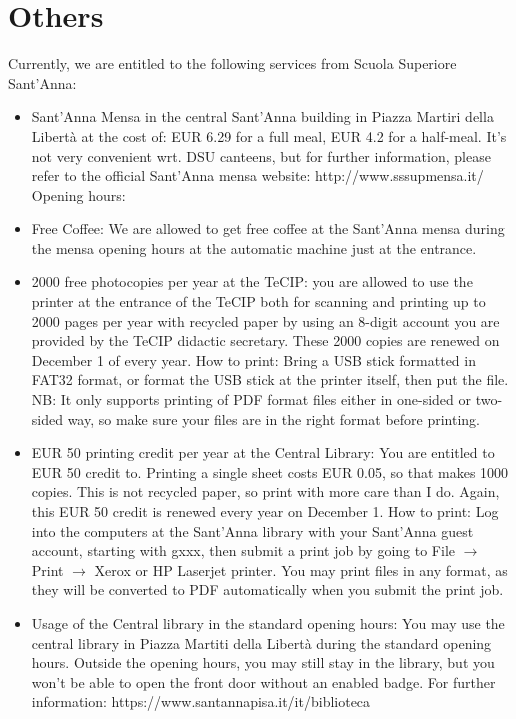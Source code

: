 \documentclass[11pt,fleqn,oneside]{book} %
\begin{document}
\section{Others}
Currently, we are entitled to the following services from Scuola Superiore Sant’Anna:
\begin{itemize}
\item Sant’Anna Mensa in the central Sant’Anna building in Piazza Martiri della Libertà at the cost of: EUR 6.29 for a full meal, EUR 4.2 for a half-meal. It’s not very convenient wrt. DSU canteens, but for further information, please refer to the official Sant’Anna mensa website: http://www.sssupmensa.it/
Opening hours: 
\item Free Coffee: We are allowed to get free coffee at the Sant’Anna mensa during the mensa opening hours at the automatic machine just at the entrance. 
\item 2000 free photocopies per year at the TeCIP: you are allowed to use the printer at the entrance of the TeCIP both for scanning and printing up to 2000 pages per year with recycled paper by using an 8-digit account you are provided by the TeCIP didactic secretary. These 2000 copies are renewed on December 1 of every year. 
How to print: Bring a USB stick formatted in FAT32 format, or format the USB stick at the printer itself, then put the file. NB: It only supports printing of PDF format files either in one-sided or two-sided way, so make sure your files are in the right format before printing. 
\item EUR 50 printing credit per year at the Central Library: You are entitled to EUR 50 credit to. Printing a single sheet costs EUR 0.05, so that makes 1000 copies. This is not recycled paper, so print with more care than I do. Again, this EUR 50 credit is renewed every year on December 1. 
How to print: Log into the computers at the Sant’Anna library with your Sant’Anna guest account, starting with gxxx, then submit a print job by going to File $\rightarrow$ Print $\rightarrow$ Xerox or HP Laserjet printer. You may print files in any format, as they will be converted to PDF automatically when you submit the print job. 
\item Usage of the Central library in the standard opening hours: You may use the central library in Piazza Martiti della Libertà during the standard opening hours. Outside the opening hours, you may still stay in the library, but you won’t be able to open the front door without an enabled badge. For further information: https://www.santannapisa.it/it/biblioteca

\end{itemize}
\end{document}
